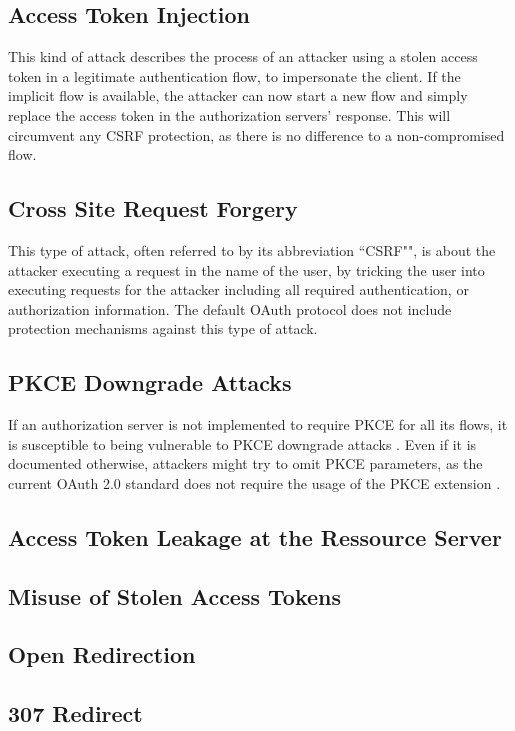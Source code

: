 \documentclass[
    fontsize=12pt,
    headings=small,
    parskip=half,           %
    bibliography=totoc,
    numbers=noenddot,       %
    open=any,               %
    ]{scrreprt}
\begin{document}
\subsection{Access Token Injection}
This kind of attack describes the process of an attacker using a stolen access
token in a legitimate authentication flow, to impersonate the client. If the
implicit flow is available, the attacker can now start a new flow and simply
replace the access token in the authorization servers' response. This will
circumvent any CSRF protection, as there is no difference to a non-compromised
flow. \cite{lodderstedt2020oauth}


\subsection{Cross Site Request Forgery}
This type of attack, often referred to by its abbreviation ``CSRF"", is about
the attacker executing a request in the name of the user, by tricking the user
into executing requests for the attacker including all required authentication,
or authorization information. The default OAuth protocol does not include
protection mechanisms against this type of attack. 

\subsection{PKCE Downgrade Attacks}
If an authorization server is not implemented to require PKCE for all its
flows, it is susceptible to being vulnerable to PKCE downgrade attacks
\cite{philippaerts2022oauch}. Even if it is documented otherwise, attackers
might try to omit PKCE parameters, as the current OAuth 2.0 standard does not
require the usage of the PKCE extension \cite{hardt2012rfc}. 


\subsection{Access Token Leakage at the Ressource Server}

\subsection{Misuse of Stolen Access Tokens}

\subsection{Open Redirection}

\subsection{307 Redirect}
\end{document}
